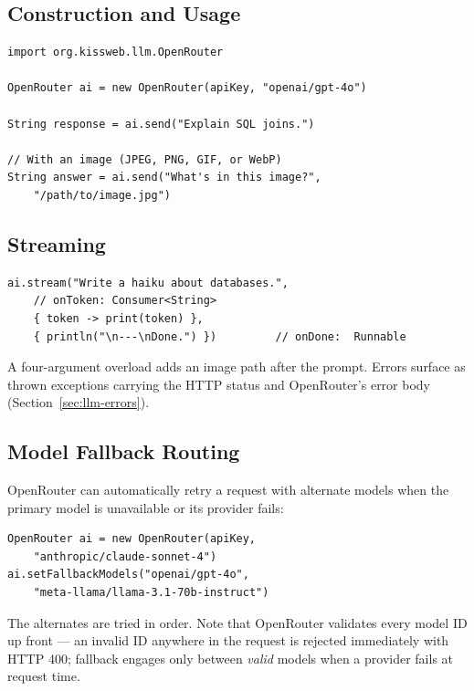 \subsection{Construction and Usage}

\begin{lstlisting}[style=groovy]
import org.kissweb.llm.OpenRouter

OpenRouter ai = new OpenRouter(apiKey, "openai/gpt-4o")

String response = ai.send("Explain SQL joins.")

// With an image (JPEG, PNG, GIF, or WebP)
String answer = ai.send("What's in this image?",
    "/path/to/image.jpg")
\end{lstlisting}

\subsection{Streaming}

\begin{lstlisting}[style=groovy]
ai.stream("Write a haiku about databases.",
    // onToken: Consumer<String>
    { token -> print(token) },
    { println("\n---\nDone.") })         // onDone:  Runnable
\end{lstlisting}

\noindent
A four-argument overload adds an image path after the prompt.  Errors surface as thrown exceptions carrying the HTTP status and OpenRouter's error body (Section~\ref{sec:llm-errors}).

\subsection{Model Fallback Routing}

OpenRouter can automatically retry a request with alternate models when the primary model is unavailable or its provider fails:

\begin{lstlisting}[style=groovy]
OpenRouter ai = new OpenRouter(apiKey,
    "anthropic/claude-sonnet-4")
ai.setFallbackModels("openai/gpt-4o",
    "meta-llama/llama-3.1-70b-instruct")
\end{lstlisting}

\noindent
The alternates are tried in order.  Note that OpenRouter validates every model ID up front --- an invalid ID anywhere in the request is rejected immediately with HTTP 400; fallback engages only between \emph{valid} models when a provider fails at request time.

